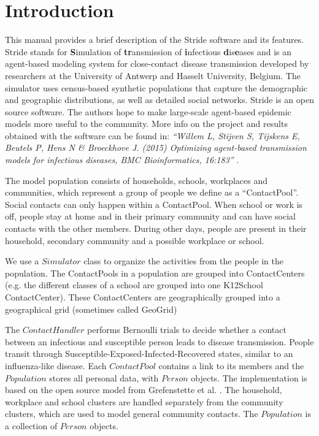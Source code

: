 \chapter{Introduction}
\label{chap:Introduction}
  
This manual provides a brief description of the Stride software and its
features. 
Stride stands for \textbf{S}imulation of \textbf{tr}ansmission 
 of \textbf{i}nfectious \textbf{d}is\textbf{e}ases and is an agent-based modeling 
system for close-contact disease transmission developed by researchers at the
University of Antwerp and Hasselt University, Belgium.
The simulator uses census-based synthetic populations
that capture the demographic and geographic distributions, as well as detailed social networks.
Stride is an open source software. The authors hope to make large-scale
agent-based epidemic models more useful to the community.
More info on the project and results obtained with the software
can be found in: 
\textit{``Willem L, Stijven S, Tijskens E, Beutels P, Hens N \& Broeckhove J. (2015) Optimizing agent-based transmission models for infectious diseases, BMC Bioinformatics, 16:183''} \cite{willem2015}.

The model population consists of households, schools, workplaces and
communities, which represent a group of people we define as a ``ContactPool''.
Social contacts can only happen within a ContactPool.
When school or work is off, people stay at home and in their primary
community and can have social contacts with the other members.
During other days, people are present in their household, secondary community
and a possible workplace or school.  



We use a $Simulator$ class to organize the activities from the people in the population.
The ContactPools in a population are grouped into ContactCenters (e.g. the different classes of a school are grouped into one K12School ContactCenter).
These ContactCenters are geographically grouped into a geographical grid (sometimes called GeoGrid)

The $Contact Handler$ performs Bernoulli trials to decide whether a contact
between an infectious and susceptible person leads to disease transmission. 
People transit through Susceptible-Exposed-Infected-Recovered states,
similar to an influenza-like disease.
Each $ContactPool$ contains a link to its members and the $Population$ stores all personal
data, with $Person$ objects.
The implementation is based on the open source model from Grefenstette et al. \cite{grefenstette2013}. 
The household, workplace and school clusters are handled separately from the
community clusters, which are used to model general community contacts. The
$Population$ is a collection of $Person$ objects.

